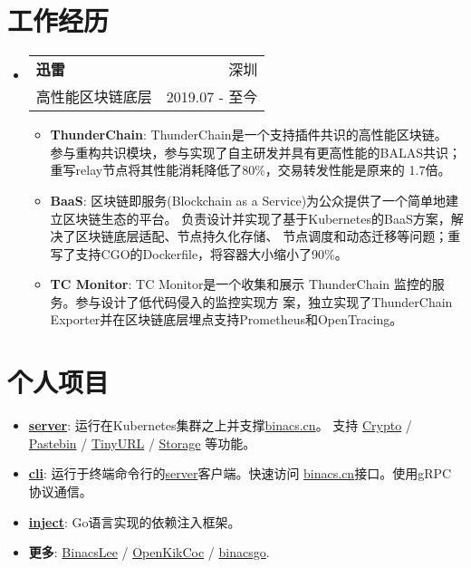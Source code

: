 \documentclass[letterpaper,12pt]{article}
\makeatletter
\newcommand{\resumeItem}[2]{
  \item\small{
    \textbf{#1}{: #2 \vspace{-2pt}}
  }
}
\newcommand{\resumeSubheading}[4]{
  \vspace{-1pt}\item
    \begin{tabular*}{0.97\textwidth}[t]{l@{\extracolsep{\fill}}r}
      \textbf{#1} & #2 \\
      \textup{\small#3} & \textup{\small #4} \\
    \end{tabular*}\vspace{-5pt}
}
\newcommand{\resumeSubItem}[2]{\resumeItem{#1}{#2}\vspace{-4pt}}
\newcommand{\resumeSubHeadingListStart}{\begin{itemize}[leftmargin=*]}
\newcommand{\resumeSubHeadingListEnd}{\end{itemize}}
\newcommand{\resumeItemListStart}{\begin{itemize}}
\newcommand{\resumeItemListEnd}{\end{itemize}\vspace{-5pt}}
\makeatother
\begin{document}
\begin{CJK*}{UTF8}{gbsn}
\section{工作经历}
  \resumeSubHeadingListStart
    \resumeSubheading
      {迅雷}{深圳}
      {高性能区块链底层}{2019.07 - 至今}
      \resumeItemListStart
        \resumeItem{ThunderChain}
          {ThunderChain是一个支持插件共识的高性能区块链。
          参与重构共识模块，参与实现了自主研发并具有更高性能的BALAS共识；
          重写relay节点将其性能消耗降低了80\%，交易转发性能是原来的 1.7倍。}
        \resumeItem{BaaS}
          {区块链即服务(Blockchain as a Service)为公众提供了一个简单地建立区块链生态的平台。
          负责设计并实现了基于Kubernetes的BaaS方案，解决了区块链底层适配、节点持久化存储、
          节点调度和动态迁移等问题；重写了支持CGO的Dockerfile，将容器大小缩小了90\%。}
        \resumeItem{TC Monitor}
          {TC Monitor是一个收集和展示 ThunderChain 监控的服务。参与设计了低代码侵入的监控实现方
          案，独立实现了ThunderChain Exporter并在区块链底层埋点支持Prometheus和OpenTracing。}
      \resumeItemListEnd
  \resumeSubHeadingListEnd

\section{个人项目}
  \resumeSubHeadingListStart
    \resumeSubItem{\href{https://github.com/BinacsLee/server}{server}}
      {运行在Kubernetes集群之上并支撑\href{https://binacs.cn/}{binacs.cn}。
      支持   \href{https://binacs.cn/toys/crypto}{Crypto} / 
                \href{https://binacs.cn/toys/pastebin}{Pastebin} / 
                \href{https://binacs.cn/toys/tinyurl}{TinyURL} / 
                \href{https://binacs.cn/toys/storage}{Storage}
      等功能。}
    \resumeSubItem{\href{https://github.com/BinacsLee/cli}{cli}}
      {运行于终端命令行的\href{https://github.com/BinacsLee/server}{server}客户端。快速访问
      \href{https://binacs.cn/}{binacs.cn}接口。使用gRPC协议通信。}
    \resumeSubItem{\href{https://github.com/binacsgo/inject}{inject}}
      {Go语言实现的依赖注入框架。}
    \resumeSubItem{更多}
      {\href{https://github.com/BinacsLee}{BinacsLee} /
       \href{https://github.com/OpenKikCoc}{OpenKikCoc} /
       \href{https://github.com/binacsgo}{binacsgo}.}
  \resumeSubHeadingListEnd

\end{CJK*}
\end{document}
